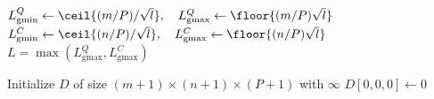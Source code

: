 \begin{algorithm}[htbp] %
\caption{Initialization of PSDTW}
\label{alg:psdtw-constrained-initial}
\begin{algorithmic}[1]

\State $L_{\mathrm{gmin}}^Q \gets \ceil{(m/P)/\sqrt{l}}, 
\quad L_{\mathrm{gmax}}^Q \gets \floor{(m/P)\sqrt{l}}$ 
\State $L_{\mathrm{gmin}}^C \gets \ceil{(n/P)/\sqrt{l}}, 
\quad L_{\mathrm{gmax}}^C \gets \floor{(n/P)\sqrt{l}}$
\State $L = \max(L_{\mathrm{gmax}}^Q, L_{\mathrm{gmax}}^C)$

\State Initialize $D$ of size $(m+1) \times (n+1) \times (P+1)$ with $\infty$
\State $D[0,0,0] \gets 0$
\end{algorithmic}
\end{algorithm}